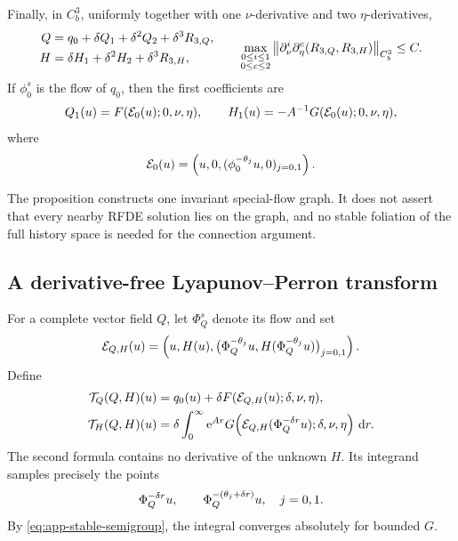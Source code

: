 \begin{proposition}
Finally, in \(C_b^3\), uniformly together with one \(\nu\)-derivative and
two \(\eta\)-derivatives,
\begin{equation}
\label{eq:app-graph-expansion}
\begin{aligned}
 Q&=q_0+\delta Q_1+\delta^2Q_2+\delta^3R_{3,Q},\\
 H&=\delta H_1+\delta^2H_2+\delta^3R_{3,H},
\end{aligned}
\qquad
 \max_{\substack{0\leq i\leq1\\0\leq c\leq2}}
 \left\lVert \partial_\nu^i\partial_\eta^c(R_{3,Q},R_{3,H})\right\rVert_{C_b^3}
 \leq C.
\end{equation}
If \(\phi_0^s\) is the flow of \(q_0\), then the first coefficients are
\begin{equation}
\label{eq:app-first-graph-coefficients}
 Q_1(u)=F(\mathcal E_0(u);0,\nu,\eta),
 \qquad
 H_1(u)=-A^{-1}G(\mathcal E_0(u);0,\nu,\eta),
\end{equation}
where
\begin{equation}
\label{eq:app-E0}
 \mathcal E_0(u)=
 \left(u,0,
  (\phi_0^{-\theta_j}u,0)_{j=0,1}\right).
\end{equation}
\end{proposition}

The proposition constructs one invariant special-flow graph.  It does not
assert that every nearby RFDE solution lies on the graph, and no stable
foliation of the full history space is needed for the connection argument.

\subsection{A derivative-free Lyapunov--Perron transform}
\label{app:compact-LP-transform}

For a complete vector field \(Q\), let \(\Phi_Q^s\) denote its flow and set
\begin{equation}
\label{eq:app-history-evaluation}
 \mathcal E_{Q,H}(u)=
 \left(u,H(u),
   \bigl(\Phi_Q^{-\theta_j}u,
         H(\Phi_Q^{-\theta_j}u)\bigr)_{j=0,1}\right).
\end{equation}
Define
\begin{equation}
\label{eq:app-graph-transform}
\begin{aligned}
 \mathcal T_Q(Q,H)(u)
 &=q_0(u)+\delta F(\mathcal E_{Q,H}(u);\delta,\nu,\eta),\\
 \mathcal T_H(Q,H)(u)
 &=\delta\int_0^\infty \mathrm e^{Ar}
 G\!\left(
   \mathcal E_{Q,H}(\Phi_Q^{-\delta r}u);
   \delta,\nu,\eta\right)\,\mathrm d r.
\end{aligned}
\end{equation}
The second formula contains no derivative of the unknown \(H\).  Its
integrand samples precisely the points
\begin{equation}
\label{eq:app-sampled-flow-points}
 \Phi_Q^{-\delta r}u,
 \qquad
 \Phi_Q^{-(\theta_j+\delta r)}u,
 \quad j=0,1.
\end{equation}
By \cref{eq:app-stable-semigroup}, the integral converges absolutely for
bounded \(G\).

